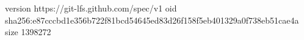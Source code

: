 version https://git-lfs.github.com/spec/v1
oid sha256:e87cccbd1e356b722f81bcd54645ed83d26f158f5eb401329a0f738eb51cae4a
size 1398272
